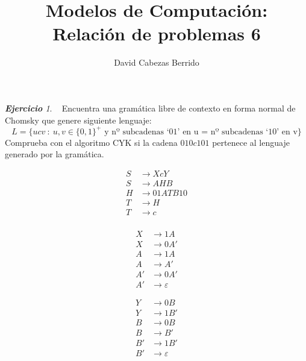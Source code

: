 \documentclass[12pt,spanish]{article}
\theoremstyle{definition}
\theoremstyle{remark}
\newtheorem{exercise}{\textbf{Ejercicio}}%
\begin{document}
\title{\vspace{-10mm} Modelos de Computación: \\ Relación de problemas
  6} \author{David Cabezas Berrido} \date{\vspace{-5mm}}
\maketitle

\setcounter{exercise}{12}

\begin{exercise}~ Encuentra una gramática libre de contexto en forma
  normal de Chomsky que genere siguiente lenguaje:
  \[L=\{ucv\ : \ u,v \in \{0,1\}^+ \text{ y nº subcadenas `01' en u =
      nº subcadenas `10' en v}\}\]
  Comprueba con el algoritmo CYK si la cadena $010c101$ pertenece al
  lenguaje generado por la gramática.
  
  \vspace{-7mm}

  \begin{multicols}{3}

    \begin{align*}
      S&\rightarrow XcY \\
      S&\rightarrow AHB \\
      H&\rightarrow 01ATB10 \\
      T&\rightarrow H \\
      T&\rightarrow c \\
      ~
    \end{align*}

    \columnbreak

    \begin{align*}
      X&\rightarrow 1A \\
      X&\rightarrow 0A' \\
      A&\rightarrow 1A \\
      A&\rightarrow A' \\
      A'&\rightarrow 0A' \\
      A'&\rightarrow \varepsilon
    \end{align*}

    \columnbreak

    \begin{align*}
      Y&\rightarrow 0B \\
      Y&\rightarrow 1B' \\
      B&\rightarrow 0B \\
      B&\rightarrow B' \\
      B'&\rightarrow 1B' \\
      B'&\rightarrow \varepsilon
    \end{align*}
  \end{multicols}


\end{exercise}
\end{document}
